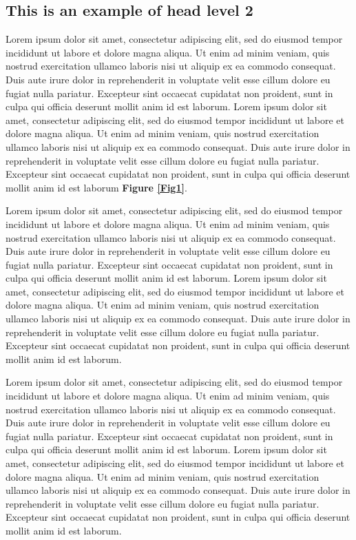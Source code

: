 \documentclass[english]{sbc2025}%
\begin{document}
\subsection{This is an example of head level 2}

Lorem ipsum dolor sit amet, consectetur adipiscing elit, sed do eiusmod tempor incididunt ut labore et dolore magna aliqua. Ut enim ad minim veniam, quis nostrud exercitation ullamco laboris nisi ut aliquip ex ea commodo consequat. Duis aute irure dolor in reprehenderit in voluptate velit esse cillum dolore eu fugiat nulla pariatur. Excepteur sint occaecat cupidatat non proident, sunt in culpa qui officia deserunt mollit anim id est laborum. Lorem ipsum dolor sit amet, consectetur adipiscing elit, sed do eiusmod tempor incididunt ut labore et dolore magna aliqua. Ut enim ad minim veniam, quis nostrud exercitation ullamco laboris nisi ut aliquip ex ea commodo consequat. Duis aute irure dolor in reprehenderit in voluptate velit esse cillum dolore eu fugiat nulla pariatur. Excepteur sint occaecat cupidatat non proident, sunt in culpa qui officia deserunt mollit anim id est laborum \textbf{Figure \ref{Fig1}}.

Lorem ipsum dolor sit amet, consectetur adipiscing elit, sed do eiusmod tempor incididunt ut labore et dolore magna aliqua. Ut enim ad minim veniam, quis nostrud exercitation ullamco laboris nisi ut aliquip ex ea commodo consequat. Duis aute irure dolor in reprehenderit in voluptate velit esse cillum dolore eu fugiat nulla pariatur. Excepteur sint occaecat cupidatat non proident, sunt in culpa qui officia deserunt mollit anim id est laborum. Lorem ipsum dolor sit amet, consectetur adipiscing elit, sed do eiusmod tempor incididunt ut labore et dolore magna aliqua. Ut enim ad minim veniam, quis nostrud exercitation ullamco laboris nisi ut aliquip ex ea commodo consequat. Duis aute irure dolor in reprehenderit in voluptate velit esse cillum dolore eu fugiat nulla pariatur. Excepteur sint occaecat cupidatat non proident, sunt in culpa qui officia deserunt mollit anim id est laborum.

Lorem ipsum dolor sit amet, consectetur adipiscing elit, sed do eiusmod tempor incididunt ut labore et dolore magna aliqua. Ut enim ad minim veniam, quis nostrud exercitation ullamco laboris nisi ut aliquip ex ea commodo consequat. Duis aute irure dolor in reprehenderit in voluptate velit esse cillum dolore eu fugiat nulla pariatur. Excepteur sint occaecat cupidatat non proident, sunt in culpa qui officia deserunt mollit anim id est laborum. Lorem ipsum dolor sit amet, consectetur adipiscing elit, sed do eiusmod tempor incididunt ut labore et dolore magna aliqua. Ut enim ad minim veniam, quis nostrud exercitation ullamco laboris nisi ut aliquip ex ea commodo consequat. Duis aute irure dolor in reprehenderit in voluptate velit esse cillum dolore eu fugiat nulla pariatur. Excepteur sint occaecat cupidatat non proident, sunt in culpa qui officia deserunt mollit anim id est laborum.
\end{document}
